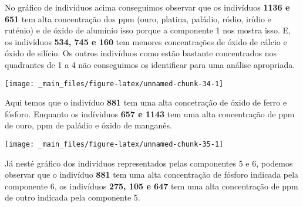 \documentclass[
]{article}
\begin{document}
No gráfico de indivíduos acima conseguimos observar que os indivíduos \textbf{1136 e 651} tem alta concentração dos ppm (ouro, platina, paládio, ródio, irídio e ruténio) e de óxido de alumínio isso porque a componente 1 nos mostra isso. E, os indivíduos \textbf{534, 745 e 160} tem menores concentrações de óxido de cálcio e óxido de silício. Os outros indivíduos como estão bastante concentrados nos quadrantes de 1 a 4 não conseguimos os identificar para uma análise apropriada.

\begin{center}\texttt{[image: \_main\_files/figure-latex/unnamed-chunk-34-1]} \end{center}

Aqui temos que o indivíduo \textbf{881} tem uma alta concetração de óxido de ferro e fósforo. Enquanto os indíviduos \textbf{657 e 1143} tem uma alta concentração de ppm de ouro, ppm de paládio e óxido de manganês.

\begin{center}\texttt{[image: \_main\_files/figure-latex/unnamed-chunk-35-1]} \end{center}

Já nesté gráfico dos indivíduos representados pelas componentes 5 e 6, podemos observar que o indivíduo \textbf{881} tem uma alta concentração de fósforo indicada pela componente 6, os indivíduos \textbf{275, 105 e 647} tem uma alta concentração de ppm de outro indicada pela componente 5.

\newpage
\end{document}
